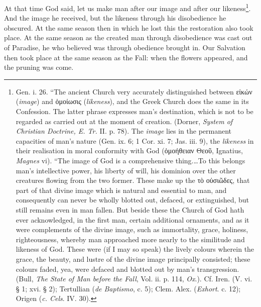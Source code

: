 At that time God said, let us make man after our image and after our likeness\footnote{Gen. i. 26. “The ancient Church very accurately distinguished between \textgreek{εἰκών} (\emph{image}) and \textgreek{ὁμοίωσις} (\emph{likeness}), and the Greek Church does the same in its Confession. The latter phrase expresses man’s destination, which is not to be regarded as carried out at the moment of creation. (Dorner, \emph{System of Christian Doctrine, E. Tr.} II. p. 78). The \emph{image} lies in the permanent capacities of man’s nature (Gen. ix. 6; 1 Cor. xi. 7; Jas. iii. 9), the \emph{likeness} in their realisation in moral conformity with God (\textgreek{ὁμοήθειαν Θεοῦ}, Ignatius, \emph{Magnes} vi). “The image of God is a comprehensive thing.…To this belongs man’s intellective power, his liberty of will, his dominion over the other creatures flowing from the two former. These make up the \textgreek{τὸ οὐσιῶδες}, that part of that divine image which is natural and essential to man, and consequently can never be wholly blotted out, defaced, or extinguished, but still remains even in man fallen. But beside these the Church of God hath ever acknowledged, in the first man, certain additional ornaments, and as it were complements of the divine image, such as immortality, grace, holiness, righteousness, whereby man approached more nearly to the similitude and likeness of God. These were (if I may so speak) the lively colours wherein the grace, the beauty, and lustre of the divine image principally consisted; these colours faded, yea, were defaced and blotted out by man’s transgression. (Bull, \emph{The State of Man before the Fall}, Vol. ii. p. 114, \emph{Ox}.). Cf. Iren. (V. vi. § 1; xvi. § 2); Tertullian (\emph{de Baptismo}, c. 5); Clem. Alex. (\emph{Exhort}. c. 12); Origen (\emph{c. Cels}. IV. 30).}. And the image he received, but the likeness through his disobedience he obscured. At the same season then in which he lost this the restoration also took place. At the same season as the created man through disobedience was cast out of Paradise, he who believed was through obedience brought in. Our Salvation then took place at the same season as the Fall: when the flowers appeared, and the pruning was come.

